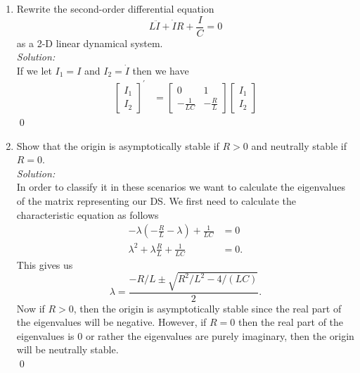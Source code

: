 \documentclass[10pt]{amsart}
\theoremstyle{nonumberplain}
\begin{document}
\begin{enumerate}[label={\bf {\arabic*}:}]
\begin{enumerate}
\item Rewrite the second-order differential equation
$$L \ddot I + \dot I R + \frac I C = 0$$
as a 2-D linear dynamical system. \\
\textit{Solution:} \\
If we let $I_1 = I$ and $I_2 = \dot I$ then we have
\begin{align*}
\begin{bmatrix}
I_1 \\ I_2
\end{bmatrix}^\prime
&= \begin{bmatrix}
0 & 1 \\
-\frac 1 {LC} & -\frac R L
\end{bmatrix} \begin{bmatrix}
I_1 \\ I_2
\end{bmatrix}
\end{align*}
\qed \\

\item Show that the origin is asymptotically stable if $R > 0$ and neutrally stable if $R = 0$. \\
\textit{Solution:} \\
In order to classify it in these scenarios we want to calculate the eigenvalues of the matrix representing our DS.
We first need to calculate the characteristic equation as follows
\begin{align*}
-\lambda \left(- \frac R L - \lambda \right) + \frac 1 {LC} &= 0 \\
\lambda^2 + \lambda \frac R L + \frac 1 {LC} &= 0.
\end{align*}
This gives us
\begin{equation}
\lambda = \frac {-R/L \pm \sqrt{R^2/L^2 - 4/(LC)} }{2}.
\label{eq:eq2}
\end{equation}
Now if $R > 0$, then the origin is asymptotically stable since the real part of the eigenvalues will be negative.
However, if $R = 0$ then the real part of the eigenvalues is $0$ or rather the eigenvalues are purely imaginary, then the origin will be neutrally stable. \\
\qed \\


\end{enumerate}
\end{enumerate}
\end{document}
